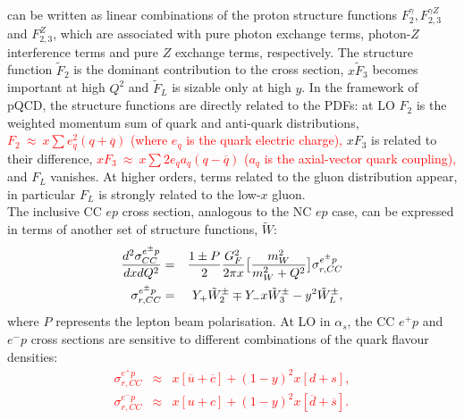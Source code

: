 can be written as linear combinations of the proton structure functions $F^{\gamma}_2, F^{\gamma Z}_{2,3}$ 
and $F^Z_{2,3}$, which are associated with pure photon exchange terms, photon-$Z$ interference
terms and pure $Z$ exchange terms, respectively. 
The structure function $\tilde F_2$ is the dominant contribution to the cross section, 
$x \tilde F_3$ becomes important at high $Q^2$ and $\tilde F_L$ is sizable 
only at high $y$. 
In the framework of pQCD, the structure functions are directly related to the 
PDFs: at LO $F_2$ is the weighted momentum sum of quark and anti-quark distributions, 
\textcolor{red}{
$F_2~\approx~x \sum e^2_q (q+ \overline q)$ (where $e_q$ is the quark electric charge),
}
$xF_3$ is related to their difference, 
\textcolor{red}{
$xF_3~\approx~x \sum 2e_q a_q (q- \overline q)$ ($a_q$ is the axial-vector quark coupling),
}
and $F_L$ vanishes. At higher orders, terms related to the gluon distribution
appear, in particular $F_L$ is strongly related to the low-$x$ 
gluon.
\\
The inclusive CC $ep$ cross section, analogous to the NC $ep$ case, can be expressed in terms of another set 
of structure functions, $\tilde W$: 
\begin{eqnarray}
\centering
   \frac{d^2\sigma_{CC}^{e^{\pm} p}}{dxdQ^2}&=&\frac{1\pm P}{2}\frac{G^2_F}{2\pi x}\big [\frac{m^2_W}{m^2_W+Q^2}\big ]\sigma_{r,CC}^{e^{\pm} p}\\
   \sigma_{r,CC}^{e^{\pm} p}&= &  Y_{+} \tilde W_2^{\pm} \mp Y_{-}x \tilde W_3^{\pm} - y^2 \tilde W_L^{\pm},
\end{eqnarray}
where $P$ represents the lepton beam polarisation.
At LO in $\alpha_s$, the CC $e^+p$ and $e^-p$ cross sections are sensitive to 
different combinations of the quark flavour densities:
\textcolor{red}{
 \begin{eqnarray}
  \nonumber
     \sigma_{r,CC}^{e^{+} p} &\approx& 
       x [\overline u + \overline c] + (1-y)^2 x [d+s], \\
  \nonumber
     \sigma_{r,CC}^{e^{-} p} &\approx& 
       x[u+c] + (1-y)^2 x[\overline d + \overline s].
 \end{eqnarray}
}

